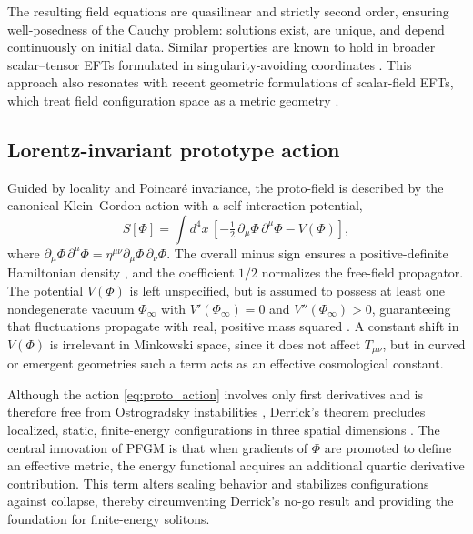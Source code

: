 \documentclass{article}
\begin{document}
The resulting field equations are quasilinear and strictly second order, ensuring well-posedness of the Cauchy problem: solutions exist, are unique, and depend continuously on initial data. Similar properties are known to hold in broader scalar–tensor EFTs formulated in singularity-avoiding coordinates \cite{Kovacs2020_WellPosed,AresteSalo2022_WellPosed}. This approach also resonates with recent geometric formulations of scalar-field EFTs, which treat field configuration space as a metric geometry \cite{Cohen2025_Geometry}.


\subsection{Lorentz-invariant prototype action}

Guided by locality and Poincaré invariance, the proto-field is described by the canonical Klein–Gordon action with a self-interaction potential,
\begin{equation}
S[\Phi] = \int d^4x \,
\left[-\tfrac{1}{2}\,\partial_\mu\Phi\,\partial^\mu\Phi - V(\Phi)\right],
\label{eq:proto_action}
\end{equation}
where $\partial_\mu\Phi\,\partial^\mu\Phi=\eta^{\mu\nu}\partial_\mu\Phi\,\partial_\nu\Phi$. The overall minus sign ensures a positive-definite Hamiltonian density \cite{Peskin1995,Weinberg1995}, and the coefficient $1/2$ normalizes the free-field propagator. The potential $V(\Phi)$ is left unspecified, but is assumed to possess at least one nondegenerate vacuum $\Phi_\infty$ with $V'(\Phi_\infty)=0$ and $V''(\Phi_\infty)>0$, guaranteeing that fluctuations propagate with real, positive mass squared \cite{Ryder1996}. A constant shift in $V(\Phi)$ is irrelevant in Minkowski space, since it does not affect $T_{\mu\nu}$, but in curved or emergent geometries such a term acts as an effective cosmological constant.

Although the action \eqref{eq:proto_action} involves only first derivatives and is therefore free from Ostrogradsky instabilities \cite{Woodard2015}, Derrick’s theorem precludes localized, static, finite-energy configurations in three spatial dimensions \cite{Derrick1964}. The central innovation of PFGM is that when gradients of $\Phi$ are promoted to define an effective metric, the energy functional acquires an additional quartic derivative contribution. This term alters scaling behavior and stabilizes configurations against collapse, thereby circumventing Derrick’s no-go result and providing the foundation for finite-energy solitons.
\end{document}
